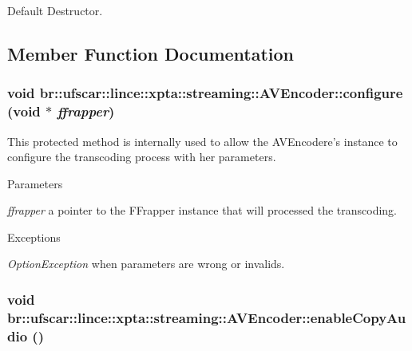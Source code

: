 Default Destructor. 



\subsection{Member Function Documentation}
\hypertarget{classbr_1_1ufscar_1_1lince_1_1xpta_1_1streaming_1_1AVEncoder_ab2383236fa9ef21f14f90065257cd11f}{
\subsubsection[{configure}]{\setlength{\rightskip}{0pt plus 5cm}void br::ufscar::lince::xpta::streaming::AVEncoder::configure (void $\ast$ {\em ffrapper})}}
\label{classbr_1_1ufscar_1_1lince_1_1xpta_1_1streaming_1_1AVEncoder_ab2383236fa9ef21f14f90065257cd11f}


This protected method is internally used to allow the AVEncodere's instance to configure the transcoding process with her parameters. 


\begin{DoxyParams}{Parameters}
\item[{\em ffrapper}]a pointer to the FFrapper instance that will processed the transcoding. \end{DoxyParams}

\begin{DoxyExceptions}{Exceptions}
\item[{\em OptionException}]when parameters are wrong or invalids. \end{DoxyExceptions}
\hypertarget{classbr_1_1ufscar_1_1lince_1_1xpta_1_1streaming_1_1AVEncoder_a4bb2b633a1fd7c42ae255b0badb49dae}{
\subsubsection[{enableCopyAudio}]{\setlength{\rightskip}{0pt plus 5cm}void br::ufscar::lince::xpta::streaming::AVEncoder::enableCopyAudio ()}}
\label{classbr_1_1ufscar_1_1lince_1_1xpta_1_1streaming_1_1AVEncoder_a4bb2b633a1fd7c42ae255b0badb49dae}


